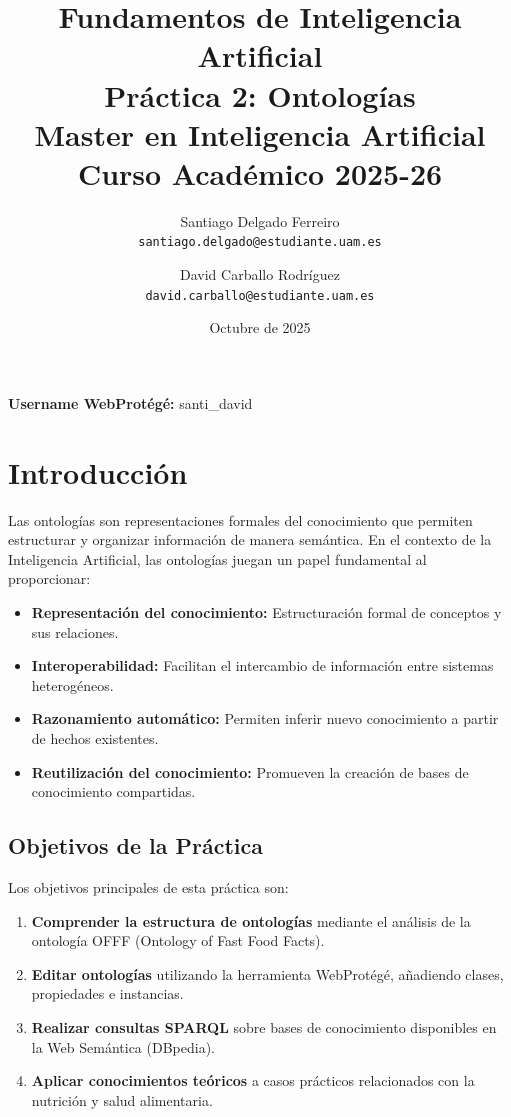 \documentclass[12pt,a4paper]{article}
\title{
    \textbf{Fundamentos de Inteligencia Artificial}\\
    \Large Práctica 2: Ontologías\\
    \large Master en Inteligencia Artificial\\
    \normalsize Curso Académico 2025-26
}
\author{
    Santiago Delgado Ferreiro\\
    \texttt{santiago.delgado@estudiante.uam.es}
    \and
    David Carballo Rodríguez\\
    \texttt{david.carballo@estudiante.uam.es}
}
\date{Octubre de 2025}
\begin{document}
\maketitle

\vfill

\begin{center}
\vspace{0.5cm}
\textbf{Username WebProtégé:} santi\_david
\end{center}

\newpage

\tableofcontents
\newpage

\setcounter{page}{1}

\section{Introducción}

Las ontologías son representaciones formales del conocimiento que permiten estructurar y organizar información de manera semántica. En el contexto de la Inteligencia Artificial, las ontologías juegan un papel fundamental al proporcionar:

\begin{itemize}
    \item \textbf{Representación del conocimiento:} Estructuración formal de conceptos y sus relaciones.
    \item \textbf{Interoperabilidad:} Facilitan el intercambio de información entre sistemas heterogéneos.
    \item \textbf{Razonamiento automático:} Permiten inferir nuevo conocimiento a partir de hechos existentes.
    \item \textbf{Reutilización del conocimiento:} Promueven la creación de bases de conocimiento compartidas.
\end{itemize}

\subsection{Objetivos de la Práctica}

Los objetivos principales de esta práctica son:

\begin{enumerate}
    \item \textbf{Comprender la estructura de ontologías} mediante el análisis de la ontología OFFF (Ontology of Fast Food Facts).
    \item \textbf{Editar ontologías} utilizando la herramienta WebProtégé, añadiendo clases, propiedades e instancias.
    \item \textbf{Realizar consultas SPARQL} sobre bases de conocimiento disponibles en la Web Semántica (DBpedia).
    \item \textbf{Aplicar conocimientos teóricos} a casos prácticos relacionados con la nutrición y salud alimentaria.
\end{enumerate}
\end{document}
